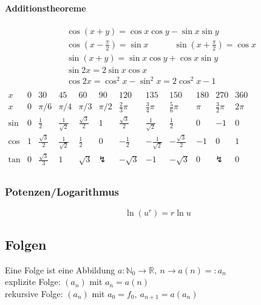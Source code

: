\documentclass[6pt,a4paper]{scrartcl}
\newcommand{\enbrace}[1]{\ensuremath{\left(#1\right)}}
\begin{document}
\begin{multicols*}{4}
\paragraph{Additionstheoreme} %
\label{par:additionstheoreme}
 \begin{eqnarray*}
 	& \cos (x + y) = \cos x \cos y - \sin x \sin y \\
	& \cos \enbrace{x - \frac{\pi}{2}} = \sin x \qquad \quad \sin \enbrace{x + \frac{\pi}{2}} = \cos x \\
    & \sin \enbrace{x + y} = \sin x \cos y + \cos x \sin y \\
& 	\sin 2x = 2 \sin x \cos x        \\
	& \cos 2x = \cos^2 x - \sin^2 x = 2\cos^2 x - 1\\
 \end{eqnarray*}
\hspace{-20pt}
\scalebox{0.77}
{
$\begin{array}{c|c|c|c|c|c|c|c|c|c|c|c}
x & 0& 30 & 45& 60 & 90 & 120 & 135& 150& 180 & 270 & 360 \\ \hline
x & 0 & \pi / 6 & \pi / 4 & \pi / 3 & \pi / 2 & \frac{2}{3}\pi& \frac{3}{4}\pi& \frac{5}{6}\pi& \pi  & \frac{3}{2}\pi & 2 \pi \\ \hline
\sin & 0 & \frac{1}{2} & \frac{1}{\sqrt{2}} & \frac{\sqrt 3}{2} & 1 & \frac{\sqrt 3}{2} & \frac{1}{\sqrt{2}} & \frac{1}{2} & 0 & -1 & 0 \\
\cos & 1 & \frac{\sqrt 3}{2} & \frac{1}{\sqrt 2} & \frac{1}{2} & 0 & -\frac{1}{2} & -\frac{1}{\sqrt 2}  & -\frac{\sqrt 3}{2}   & -1 & 0 & 1 \\     
\tan & 0 & \frac{\sqrt{3}}{3}&1 &\sqrt{3} & \lightning & -\sqrt{3}& -1& -\sqrt{3}& 0 & \lightning & 0\\
\end{array}$
}

\subsubsection{Potenzen/Logarithmus}
\begin{equation*}
\ln(u^r)=r\ln u
\end{equation*}

\subsection{Folgen}
Eine Folge ist eine Abbildung $a: \mathbb N_0 \rightarrow \mathbb R,\ n \rightarrow a(n) =: a_n$\\
explizite Folge: $(a_n)$ mit $a_n=a(n)$\\ rekursive Folge: $(a_n)$ mit $a_0=f_0,\  a_{n+1}=a(a_n)$\\


\end{multicols*}
\end{document}
